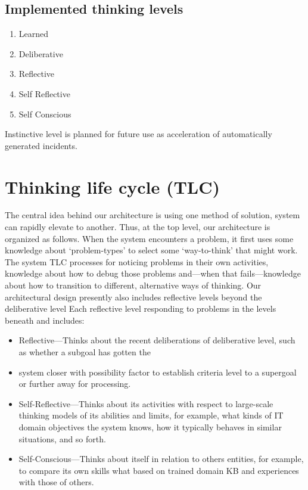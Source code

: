 \documentclass[runningheads,a4paper]{llncs}
\begin{document}
\begin{enumerate}
\subsection{Implemented thinking levels}

\begin{enumerate}
 \item Learned
 \item Deliberative
 \item Reflective
 \item Self Reflective
 \item Self Conscious
\end{enumerate}

Instinctive level is planned for future use as acceleration of automatically generated incidents.

\section{Thinking life cycle (TLC)}

The central idea behind our architecture is using one method of solution, system can rapidly elevate to another. Thus, at the top level, our architecture is organized as follows. When the system encounters a problem, it first uses some knowledge about ‘problem-types’ to select some ‘way-to-think’ that might work. 
The system TLC processes for noticing problems in their own activities, knowledge about how to debug those problems and—when that fails—knowledge about how to transition to different, alternative ways of thinking. 
Our architectural design presently also  includes reflective levels beyond the deliberative level
Each reflective level responding to problems in the levels beneath and includes:
\begin{itemize}
 \item Reflective—Thinks about the recent deliberations of deliberative level, such as whether a subgoal has gotten the
 \item system closer with possibility factor  to establish criteria level to a supergoal or further away for processing.
 \item Self-Reflective—Thinks about its activities with respect to large-scale thinking models of its abilities and limits, for example, what kinds of  IT domain objectives  the system knows, how it typically behaves in similar situations, and so forth.
 \item Self-Conscious—Thinks about itself in relation to others entities, for example, to compare its own skills what based on trained domain KB and experiences with those of others.
\end{itemize}


\end{enumerate}
\end{document}
